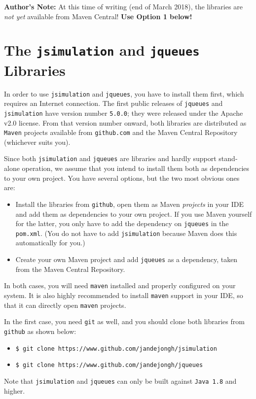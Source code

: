 {\bf Author's Note:} At this time of writing (end of March 2018),
the libraries are {\em not yet\/} available from Maven Central!
{\bf Use Option 1 below!}

\section{The \texttt{jsimulation} and \texttt{jqueues} Libraries}

In order to use \lstinline|jsimulation|
  and \lstinline|jqueues|, you have to install
  them first,
  which requires an Internet connection.
The first public releases of \lstinline|jqueues| and
  \lstinline|jsimulation| have version number \lstinline|5.0.0|;
  they were released under the Apache v2.0 license.
From that version number onward,
  both libraries are distributed as \lstinline|Maven|
  projects
  available from \lstinline|github.com|
  and the Maven Central Repository
  (whichever suits you).
  
Since both \lstinline|jsimulation|
  and \lstinline|jqueues| are libraries
  and hardly support stand-alone operation,
  we assume that you intend to install
  them both as dependencies to your own project.
You have several options, but the two most obvious ones are:
\begin{itemize}
	\item Install the libraries from \lstinline|github|,
	        open them as Maven {\em projects\/} in your IDE
	        and add them as dependencies to your own project.
	      If you use Maven yourself for the latter,
	        you only have to add
	        the dependency on \lstinline|jqueues| in the
	        \lstinline|pom.xml|.
	      (You do not have to add \lstinline|jsimulation|
            because Maven does this automatically for you.)
	\item Create your own Maven project and add
	        \lstinline|jqueues| as a dependency,
	        taken from the Maven Central Repository.
\end{itemize}
In both cases,
  you will need \lstinline|maven| installed and properly configured on your system.
It is also highly recommended to install
  \lstinline|maven| support in your IDE,
  so that it can directly open \lstinline|maven| projects.

In the first case, you need \lstinline|git| as well,
  and you should clone both libraries
  from \lstinline|github| as shown below:
\begin{itemize}
	\item \lstinline|$ git clone https://www.github.com/jandejongh/jsimulation|
	\item \lstinline|$ git clone https://www.github.com/jandejongh/jqueues|
\end{itemize}
Note that \lstinline|jsimulation| and \lstinline|jqueues|
  can only be built against \lstinline|Java 1.8| and higher.

